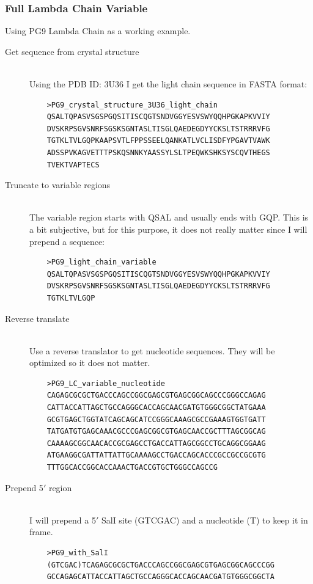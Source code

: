 \subsubsection{Full Lambda Chain Variable}
Using PG9 Lambda Chain as a working example.
\begin{description}
  \item[Get sequence from crystal structure] \hfill \\
  Using the PDB ID: 3U36 I get the light chain sequence in FASTA format:
    \begin{verbatim}
    >PG9_crystal_structure_3U36_light_chain
    QSALTQPASVSGSPGQSITISCQGTSNDVGGYESVSWYQQHPGKAPKVVIY
    DVSKRPSGVSNRFSGSKSGNTASLTISGLQAEDEGDYYCKSLTSTRRRVFG
    TGTKLTVLGQPKAAPSVTLFPPSSEELQANKATLVCLISDFYPGAVTVAWK
    ADSSPVKAGVETTTPSKQSNNKYAASSYLSLTPEQWKSHKSYSCQVTHEGS
    TVEKTVAPTECS
    \end{verbatim}
  \item[Truncate to variable regions] \hfill \\
  The variable region starts with QSAL and usually ends with GQP. This is a bit subjective, but for this purpose, it does not really matter since I will prepend a sequence:
    \begin{verbatim}
    >PG9_light_chain_variable
    QSALTQPASVSGSPGQSITISCQGTSNDVGGYESVSWYQQHPGKAPKVVIY
    DVSKRPSGVSNRFSGSKSGNTASLTISGLQAEDEGDYYCKSLTSTRRRVFG
    TGTKLTVLGQP
    \end{verbatim}
  \item[Reverse translate] \hfill \\
  Use a reverse translator to get nucleotide sequences. They will be optimized so it does not matter.
    \begin{verbatim}
    >PG9_LC_variable_nucleotide
    CAGAGCGCGCTGACCCAGCCGGCGAGCGTGAGCGGCAGCCCGGGCCAGAG
    CATTACCATTAGCTGCCAGGGCACCAGCAACGATGTGGGCGGCTATGAAA
    GCGTGAGCTGGTATCAGCAGCATCCGGGCAAAGCGCCGAAAGTGGTGATT
    TATGATGTGAGCAAACGCCCGAGCGGCGTGAGCAACCGCTTTAGCGGCAG
    CAAAAGCGGCAACACCGCGAGCCTGACCATTAGCGGCCTGCAGGCGGAAG
    ATGAAGGCGATTATTATTGCAAAAGCCTGACCAGCACCCGCCGCCGCGTG
    TTTGGCACCGGCACCAAACTGACCGTGCTGGGCCAGCCG
    \end{verbatim}
  \item[Prepend 5$'$ region] \hfill \\
  I will prepend a 5$'$ SalI site (GTCGAC) and a nucleotide (T) to keep it in frame.
    \begin{verbatim}
    >PG9_with_SalI
    (GTCGAC)TCAGAGCGCGCTGACCCAGCCGGCGAGCGTGAGCGGCAGCCCGG
    GCCAGAGCATTACCATTAGCTGCCAGGGCACCAGCAACGATGTGGGCGGCTA

\end{verbatim}
\end{description}
